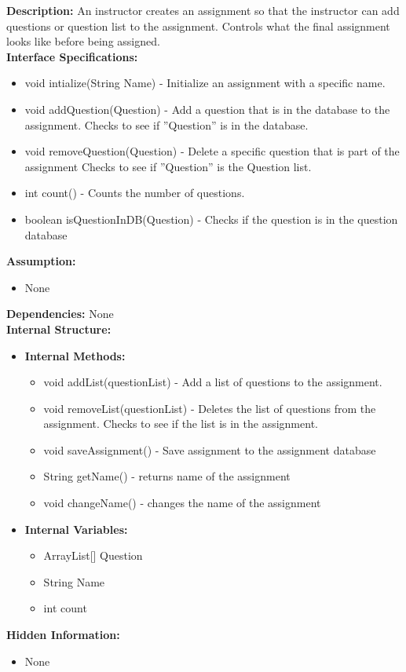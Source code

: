 \textbf{Description: }An instructor creates an assignment so that the instructor can add questions or question list to the assignment. Controls what the final assignment looks like before being assigned.\\
\textbf{Interface Specifications:}
\begin{itemize}
\item void intialize(String Name) - Initialize an assignment with a specific name.
\item void addQuestion(Question) - Add a question that is in the database to the assignment. Checks to see if ''Question'' is in the database. 
\item void removeQuestion(Question) - Delete a specific question that is part of the assignment Checks to see if ''Question'' is the Question list.
\item int count() - Counts the number of questions.
\item boolean isQuestionInDB(Question) - Checks if the question is in the question database
\end{itemize}
\textbf{Assumption:}
\begin{itemize}
\item None 
\end{itemize}
\textbf{Dependencies:} None \\
\textbf{Internal Structure:}
\begin{itemize}
\item \textbf{Internal Methods:}
\begin{itemize}
\item	void addList(questionList) - Add a list of questions to the assignment.
\item void removeList(questionList) - Deletes the list of questions from the assignment. Checks to see if the list is in the assignment.
\item void saveAssignment() - Save assignment to the assignment database
\item	String getName() - returns name of the assignment
\item	void changeName() - changes the name of the assignment
\end{itemize}
\item \textbf{Internal Variables:}
\begin{itemize}
\item	ArrayList[] Question
\item	String Name
\item	int count
\end{itemize}
\end{itemize}
\textbf{Hidden Information:}
\begin{itemize}
\item None
\end{itemize}



